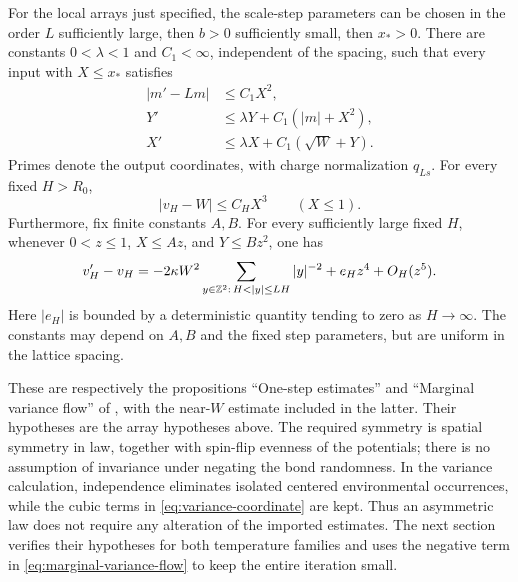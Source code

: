 \begin{proposition}
\label{prop:scale-estimates}
For the local arrays just specified, the scale-step parameters can be
chosen in the order \(L\) sufficiently large, then \(b>0\)
sufficiently small, then \(x_*>0\).  There are constants
\(0<\lambda<1\) and \(C_1<\infty\), independent of the spacing, such
that every input with \(X\le x_*\) satisfies
\begin{equation}
 \begin{split}
 |m'-Lm|&\le C_1X^2,\\
 Y'&\le\lambda Y+C_1(|m|+X^2),\\
 X'&\le\lambda X+C_1(\sqrt W+Y).
 \end{split}
 \label{eq:one-step-estimates}
\end{equation}
Primes denote the output coordinates, with charge normalization
\(q_{Ls}\).  For every fixed \(H>R_0\),
\begin{equation}
 |v_H-W|\le C_HX^3\qquad (X\le1).
 \label{eq:variance-near-W}
\end{equation}
Furthermore, fix finite constants \(A,B\).  For every sufficiently
large fixed \(H\), whenever \(0<z\le1\), \(X\le Az\), and
\(Y\le Bz^2\), one has
\begin{equation}
 v'_H-v_H=-2\kappa W^2
       \sum_{y\in\Z^2:\,H<|y|\le LH}|y|^{-2}
       +e_H z^4+O_H(z^5).
 \label{eq:marginal-variance-flow}
\end{equation}
Here \(|e_H|\) is bounded by a deterministic quantity tending to zero
as \(H\to\infty\).  The constants may depend on \(A,B\) and the fixed
step parameters, but are uniform in the lattice spacing.
\end{proposition}

These are respectively the propositions ``One-step estimates'' and
``Marginal variance flow'' of \cite[Sections~4--5]{R}, with the
near-\(W\) estimate included in the latter.  Their hypotheses are the
array hypotheses above.  The required symmetry is spatial symmetry in
law, together with spin-flip evenness of the potentials; there is no
assumption of invariance under negating the bond randomness.  In the
variance calculation, independence eliminates isolated centered
environmental occurrences, while the cubic terms in
\eqref{eq:variance-coordinate} are kept.  Thus an asymmetric law does
not require any alteration of the imported estimates.  The next section
verifies their hypotheses for both temperature families and uses the
negative term in \eqref{eq:marginal-variance-flow} to keep the entire
iteration small.
